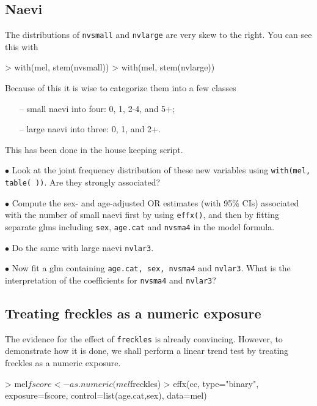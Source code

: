 \subsection{Naevi}
The distributions of {\tt nvsmall} and {\tt nvlarge} are very skew to the right. You can see this with
\begin{Schunk}
\begin{Sinput}
> with(mel, stem(nvsmall))
> with(mel, stem(nvlarge))
\end{Sinput}
\end{Schunk}
Because of this it is wise to categorize them into a few classes 
 \begin{itemize}
\item[--] small naevi into four: 0, 1, 2-4, and 5+; 
\item[--] large naevi into three: 0, 1, and 2+. 
 \end{itemize}
This has been done in
the house keeping script.

\medskip
$\bullet$
Look at the joint frequency distribution of these new variables
using {\tt with(mel, table( ))}. Are they strongly associated?

\medskip
$\bullet$ 
Compute the sex- and age-adjusted OR estimates (with 95\% CIs) associated with
the number of small naevi first by using {\tt effx()}, and 
then by fitting separate glms including {\tt sex}, {\tt age.cat} and {\tt nvsma4} in the model formula.

\medskip
$\bullet$
Do the same with large naevi {\tt nvlar3}.

\medskip
$\bullet$
Now fit a glm containing
{\tt age.cat, sex, nvsma4} and {\tt nvlar3}. 
What is the interpretation of the coefficients for {\tt nvsma4} and {\tt nvlar3}?

\subsection{Treating freckles as a numeric exposure}  

 The evidence for the effect of {\tt freckles} is already convincing. However,
 to demonstrate how it is done, we shall perform a linear trend test by treating freckles as a numeric exposure. 
\begin{Schunk}
\begin{Sinput}
> mel$fscore<-as.numeric(mel$freckles)
> effx(cc, type="binary", exposure=fscore, control=list(age.cat,sex), data=mel)
\end{Sinput}
\end{Schunk}

